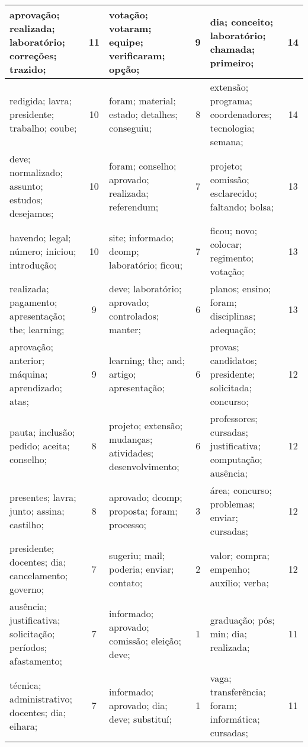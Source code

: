 \begin{table}[!h]
\begin{tabular}{|l|c||l|c||l|c|}
   aprovação; realizada; laboratório; correções; trazido;    &   11  &         votação; votaram; equipe; verificaram; opção;    &   9  &       dia; conceito; laboratório; chamada; primeiro;    &   14  \\ \hline
   redigida; lavra; presidente; trabalho; coube;    &   10  &         foram; material; estado; detalhes; conseguiu;    &   8  &       extensão; programa; coordenadores; tecnologia; semana;    &   14  \\ \hline
   deve; normalizado; assunto; estudos; desejamos;    &   10  &         foram; conselho; aprovado; realizada; referendum;    &   7  &       projeto; comissão; esclarecido; faltando; bolsa;    &   13  \\ \hline
   havendo; legal; número; iniciou; introdução;    &   10  &         site; informado; dcomp; laboratório; ficou;    &   7  &       ficou; novo; colocar; regimento; votação;    &   13  \\ \hline
   realizada; pagamento; apresentação; the; learning;    &   9  &         deve; laboratório; aprovado; controlados; manter;    &   6  &       planos; ensino; foram; disciplinas; adequação;    &   13  \\ \hline
   aprovação; anterior; máquina; aprendizado; atas;    &   9  &         learning; the; and; artigo; apresentação;    &   6  &       provas; candidatos; presidente; solicitada; concurso;    &   12  \\ \hline
   pauta; inclusão; pedido; aceita; conselho;    &   8  &         projeto; extensão; mudanças; atividades; desenvolvimento;    &   6  &       professores; cursadas; justificativa; computação; ausência;    &   12  \\ \hline
   presentes; lavra; junto; assina; castilho;    &   8  &         aprovado; dcomp; proposta; foram; processo;    &   3  &       área; concurso; problemas; enviar; cursadas;    &   12  \\ \hline
   presidente; docentes; dia; cancelamento; governo;    &   7  &         sugeriu; mail; poderia; enviar; contato;    &   2  &       valor; compra; empenho; auxílio; verba;    &   12  \\ \hline
   ausência; justificativa; solicitação; períodos; afastamento;    &   7  &         informado; aprovado; comissão; eleição; deve;    &   1  &       graduação; pós; min; dia; realizada;    &   11  \\ \hline
   técnica; administrativo; docentes; dia; eihara;    &   7  &         informado; aprovado; dia; deve; substituí;    &   1  &       vaga; transferência; foram; informática; cursadas;    &   11  \\ \hline

\end{tabular}
\end{table}
